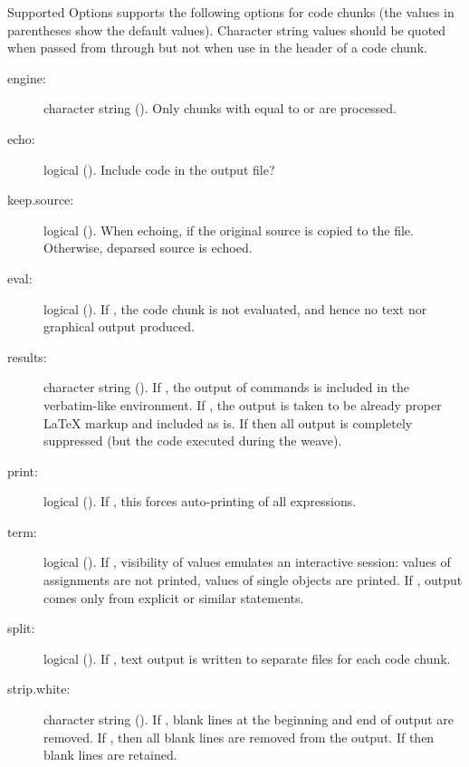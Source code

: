 \begin{Section}{Supported Options}
 supports the following options for code chunks (the
values in parentheses show the default values).  Character string
values should be quoted when passed from  through
 but not when use in the header of a code chunk.
\begin{description}
    
\item[engine:] character string ().  Only chunks with
 equal to  or  are processed.

\item[echo:] logical (). Include \R{} code in the output
file?

\item[keep.source:] logical ().  When echoing, if
 the original source is copied to the
file.  Otherwise, deparsed source is echoed.

\item[eval:] logical ().  If , the code chunk
is not evaluated, and hence no text nor graphical output
produced.

\item[results:] character string ().  If
, the output of \R{} commands is included in the
verbatim-like  environment.  If , the
output is taken to be already proper LaTeX markup and included as
is.  If  then all output is completely suppressed
(but the code executed during the weave).

\item[print:] logical ().  If , this forces
auto-printing of all expressions.

\item[term:] logical ().  If , visibility of
values emulates an interactive \R{} session: values of assignments
are not printed, values of single objects are printed.  If
, output comes only from explicit 
or similar statements.

\item[split:] logical ().  If , text output
is written to separate files for each code chunk.

\item[strip.white:] character string ().  If
, blank lines at the beginning and end of output are
removed.  If , then all blank lines are removed from
the output.  If  then blank lines are retained.


\end{description}
\end{Section}
